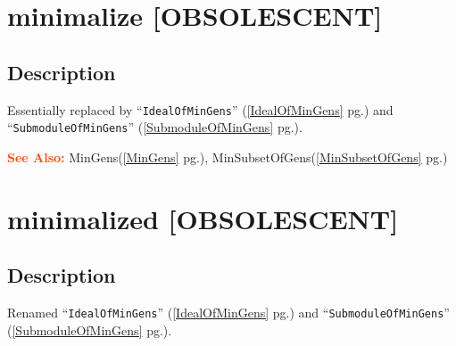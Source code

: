 \documentclass[a4paper]{mybook}
\newenvironment{command}{}{} %
\newcommand\SeeAlso{\par\textcolor{OrangeRed}{\textbf{\large See Also: }}}
\begin{document}
\section{minimalize [OBSOLESCENT]}
\label{minimalize [OBSOLESCENT]}
\begin{command} %



\subsection*{Description}

Essentially replaced by ``\verb&IdealOfMinGens&'' (\ref{IdealOfMinGens} pg.\pageref{IdealOfMinGens}) and ``\verb&SubmoduleOfMinGens&'' (\ref{SubmoduleOfMinGens} pg.\pageref{SubmoduleOfMinGens}).

\SeeAlso %
  MinGens(\ref{MinGens} pg.\pageref{MinGens}), 
    MinSubsetOfGens(\ref{MinSubsetOfGens} pg.\pageref{MinSubsetOfGens})
\end{command} %

\section{minimalized [OBSOLESCENT]}
\label{minimalized [OBSOLESCENT]}
\begin{command} %



\subsection*{Description}

Renamed ``\verb&IdealOfMinGens&'' (\ref{IdealOfMinGens} pg.\pageref{IdealOfMinGens}) and ``\verb&SubmoduleOfMinGens&'' (\ref{SubmoduleOfMinGens} pg.\pageref{SubmoduleOfMinGens}).

\end{command} %
\end{document}
